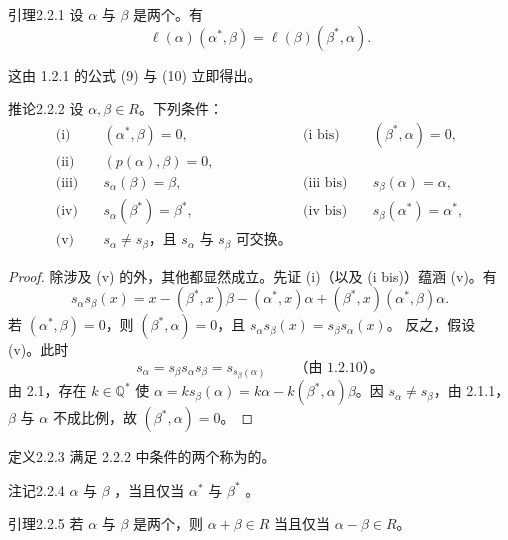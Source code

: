 \begin{SGAresult}{引理}{2.2.1}
设 $\alpha$ 与 $\beta$ 是两个。有
\[\ell(\alpha)(\alpha^*,\beta)=\ell(\beta)(\beta^*,\alpha).\tag{11}\]
\end{SGAresult}
这由 1.2.1 的公式 (9) 与 (10) 立即得出。
\begin{SGAresult}{推论}{2.2.2}
设 $\alpha,\beta\in R$。下列条件：
\begin{align*}
\text{(i)}\quad &(\alpha^*,\beta)=0,&\text{(i bis)}\quad &(\beta^*,\alpha)=0,\\
\text{(ii)}\quad &(p(\alpha),\beta)=0,\\
\text{(iii)}\quad &s_\alpha(\beta)=\beta,&\text{(iii bis)}\quad &s_\beta(\alpha)=\alpha,\\
\text{(iv)}\quad &s_\alpha(\beta^*)=\beta^*,&\text{(iv bis)}\quad &s_\beta(\alpha^*)=\alpha^*,\\
\text{(v)}\quad &s_\alpha\ne s_\beta\text{，且 }s_\alpha\text{ 与 }s_\beta\text{ 可交换。}
\end{align*}
\end{SGAresult}
\begin{proof}
除涉及 (v) 的外，其他都显然成立。先证 (i)（以及 (i bis)）蕴涵 (v)。有
\[s_\alpha s_\beta(x)=x-(\beta^*,x)\beta-(\alpha^*,x)\alpha+(\beta^*,x)(\alpha^*,\beta)\alpha.\]
若 $(\alpha^*,\beta)=0$，则 $(\beta^*,\alpha)=0$，且 $s_\alpha s_\beta(x)=s_\beta s_\alpha(x)$。
反之，假设 (v)。此时
\[s_\alpha=s_\beta s_\alpha s_\beta=s_{s_\beta(\alpha)}\qquad\text{（由 1.2.10）。}\]
由 2.1，存在 $k\in\mathbb Q^*$ 使 $\alpha=ks_\beta(\alpha)=k\alpha-k(\beta^*,\alpha)\beta$。因 $s_\alpha\ne s_\beta$，由 2.1.1，$\beta$ 与 $\alpha$ 不成比例，故 $(\beta^*,\alpha)=0$。
\end{proof}
\begin{SGAresult}{定义}{2.2.3}
满足 2.2.2 中条件的两个称为的。
\end{SGAresult}
\begin{SGAresult}{注记}{2.2.4}
 $\alpha$ 与 $\beta$ ，当且仅当 $\alpha^*$ 与 $\beta^*$ 。
\end{SGAresult}
\begin{SGAresult}{引理}{2.2.5}
若 $\alpha$ 与 $\beta$ 是两个，则 $\alpha+\beta\in R$ 当且仅当 $\alpha-\beta\in R$。
\end{SGAresult}
